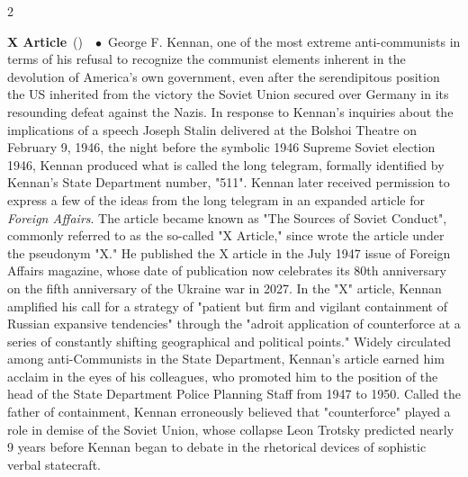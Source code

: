 \documentclass[10pt,a4paper,twoside]{article} %
\newcommand{\entry}[4]{\markboth{#1}{#1}\textbf{#1}\ {(#2)}\ \textit{#3}\ $\bullet$\ {#4}}  %
\begin{document}
\begin{multicols}{2}
\entry{X Article} {} {} {George F. Kennan, one of the most extreme anti-communists in terms of his refusal to recognize the communist elements inherent in the devolution of America's own government, even after the serendipitous position the US inherited from the victory the Soviet Union secured over Germany in its resounding defeat against the Nazis. In response to Kennan's inquiries about the implications of a speech Joseph Stalin delivered at the Bolshoi Theatre on February 9, 1946, the night before the symbolic 1946 Supreme Soviet election 1946,  Kennan produced what is called the long telegram, formally identified by Kennan's State Department number, "511". Kennan later received permission to express a few of the ideas from the long telegram in an expanded article for \emph{Foreign Affairs}. The article became known as "The Sources of Soviet Conduct", commonly referred to as the so-called "X Article," since wrote the article under the pseudonym "X." He published the X article in the July 1947 issue of Foreign Affairs magazine, whose date of publication now celebrates its 80th anniversary on the fifth anniversary of the Ukraine war in 2027. In the "X" article, Kennan amplified his call for a strategy of "patient but firm and vigilant containment of Russian expansive tendencies" through the "adroit application of counterforce at a series of constantly shifting geographical and political points." Widely circulated among anti-Communists in the State Department, Kennan's article earned him acclaim in the eyes of his colleagues, who promoted him to the position of the head of the State Department Police Planning Staff from 1947 to 1950. Called the father of containment, Kennan erroneously believed that "counterforce" played a role in demise of the Soviet Union, whose collapse Leon Trotsky predicted nearly 9 years before Kennan began to debate in the rhetorical devices of sophistic verbal statecraft. 
} 


\end{multicols}
\end{document}

